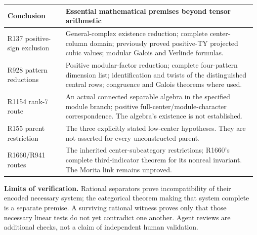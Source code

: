 \documentclass[11pt,a4paper]{article}
\begin{document}
\begin{center}
\renewcommand{\arraystretch}{1.15}
\begin{tabular}{@{}p{3.4cm}p{12cm}@{}}\toprule
Conclusion & Essential mathematical premises beyond tensor arithmetic\\\midrule
R137 positive-sign exclusion & General-complex existence reduction; complete center-column domain; previously proved positive-TY projected cubic values; modular Galois and Verlinde formulas.\\
R928 pattern reductions & Positive modular-factor reduction; complete four-pattern dimension list; identification and twists of the distinguished central rows; congruence and Galois theorems where used.\\
R1154 rank-7 route & An actual connected separable algebra in the specified module branch; positive full-center/module-character correspondence. The algebra's existence is not established.\\
R155 parent restriction & The three explicitly stated low-center hypotheses. They are not asserted for every unconstructed parent.\\
R1660/R941 routes & The inherited center-subcategory restrictions; R1660's complete third-indicator theorem for its nonreal invariant. The Morita link remains unproved.\\\bottomrule
\end{tabular}
\end{center}

\textbf{Limits of verification.} Rational separators prove incompatibility of their encoded necessary system; the categorical theorem making that system complete is a separate premise. A surviving rational witness proves only that those necessary linear tests do not yet contradict one another. Agent reviews are additional checks, not a claim of independent human validation.
\end{document}
